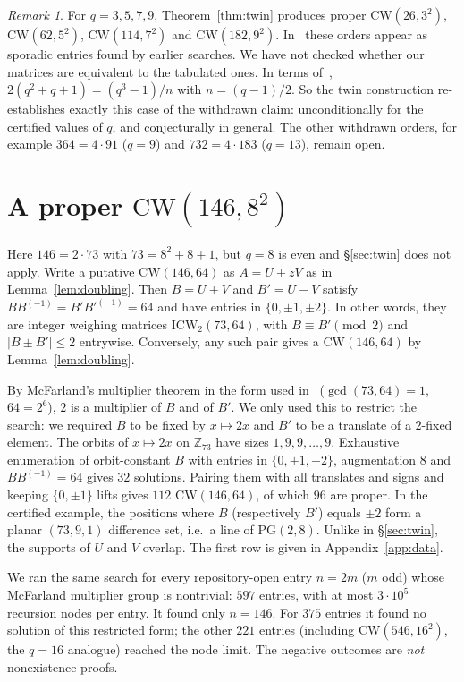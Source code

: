 \documentclass[11pt]{article}
\numberwithin{equation}{section}
\theoremstyle{definition}
\theoremstyle{remark}
\newtheorem{remark}[theorem]{Remark}
\newcommand{\Z}{\mathbb Z}
\newcommand{\CW}{\mathrm{CW}}
\newcommand{\ICW}{\mathrm{ICW}}
\begin{document}
\begin{remark}
For $q=3,5,7,9$, Theorem~\ref{thm:twin} produces proper $\CW(26,3^2)$, $\CW(62,5^2)$,
$\CW(114,7^2)$ and $\CW(182,9^2)$. In~\cite{G26} these orders appear as sporadic entries found by
earlier searches. We have not checked whether our matrices are equivalent to the tabulated ones.
In terms of~\cite[Theorem~6.6]{AGZ}, $2(q^2+q+1)=(q^3-1)/n$ with $n=(q-1)/2$. So the twin
construction re-establishes exactly this case of the withdrawn claim: unconditionally for the
certified values of $q$, and conjecturally in general. The other withdrawn orders, for example
$364=4\cdot91$ ($q=9$) and $732=4\cdot183$ ($q=13$), remain open.
\end{remark}

\section{A proper \texorpdfstring{$\CW(146,8^2)$}{CW(146,64)}}\label{sec:146}

Here $146=2\cdot73$ with $73=8^2+8+1$, but $q=8$ is even and \S\ref{sec:twin} does not apply.
Write a putative $\CW(146,64)$ as $A=U+zV$ as in Lemma~\ref{lem:doubling}. Then $B=U+V$ and
$B'=U-V$ satisfy $BB^{(-1)}=B'B'^{(-1)}=64$ and have entries in $\{0,\pm1,\pm2\}$. In other words,
they are integer weighing matrices $\ICW_2(73,64)$, with $B\equiv B'\pmod 2$ and
$|B\pm B'|\le2$ entrywise. Conversely, any such pair gives a $\CW(146,64)$ by
Lemma~\ref{lem:doubling}.

By McFarland's multiplier theorem in the form used in~\cite[Theorem~4.1]{AGZ}
($\gcd(73,64)=1$, $64=2^6$), $2$ is a multiplier of $B$ and of $B'$. We only used this to
restrict the search: we required $B$ to be fixed by $x\mapsto2x$ and $B'$ to be a translate of
a $2$-fixed element. The orbits of $x\mapsto2x$ on $\Z_{73}$ have sizes $1,9,9,\dots,9$.
Exhaustive enumeration of orbit-constant $B$ with entries in $\{0,\pm1,\pm2\}$, augmentation $8$
and $BB^{(-1)}=64$ gives $32$ solutions. Pairing them with all translates and signs and keeping
$\{0,\pm1\}$ lifts gives $112$ $\CW(146,64)$, of which $96$ are proper. In the certified
example, the positions where $B$ (respectively $B'$) equals $\pm2$ form a planar $(73,9,1)$
difference set, i.e.\ a line of $\mathrm{PG}(2,8)$. Unlike in \S\ref{sec:twin}, the supports of
$U$ and $V$ overlap. The first row is given in Appendix~\ref{app:data}.

We ran the same search for every repository-open entry $n=2m$ ($m$ odd) whose McFarland multiplier
group is nontrivial: $597$ entries, with at most $3\cdot10^5$ recursion nodes per entry. It found
only $n=146$. For $375$ entries it found no solution of this restricted form; the other $221$
entries (including $\CW(546,16^2)$, the $q=16$ analogue) reached the node limit. The negative
outcomes are \emph{not} nonexistence proofs.
\end{document}
